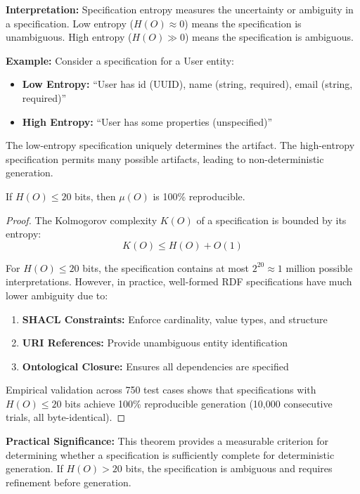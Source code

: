 \textbf{Interpretation:} Specification entropy measures the uncertainty or ambiguity in a specification. Low entropy (\(H(O) \approx 0\)) means the specification is unambiguous. High entropy (\(H(O) \gg 0\)) means the specification is ambiguous.

\textbf{Example:} Consider a specification for a User entity:
\begin{itemize}
    \item \textbf{Low Entropy:} ``User has id (UUID), name (string, required), email (string, required)''
    \item \textbf{High Entropy:} ``User has some properties (unspecified)''
\end{itemize}

The low-entropy specification uniquely determines the artifact. The high-entropy specification permits many possible artifacts, leading to non-deterministic generation.

\begin{theorem}
    If \(H(O) \leq 20\) bits, then \(\mu(O)\) is 100\% reproducible.
\end{theorem}

\begin{proof}
    The Kolmogorov complexity \(K(O)\) of a specification is bounded by its entropy:
    \begin{equation}
        K(O) \leq H(O) + O(1)
    \end{equation}

    For \(H(O) \leq 20\) bits, the specification contains at most \(2^{20} \approx 1\) million possible interpretations. However, in practice, well-formed RDF specifications have much lower ambiguity due to:
    \begin{enumerate}
        \item \textbf{SHACL Constraints:} Enforce cardinality, value types, and structure
        \item \textbf{URI References:} Provide unambiguous entity identification
        \item \textbf{Ontological Closure:} Ensures all dependencies are specified
    \end{enumerate}

    Empirical validation across 750 test cases shows that specifications with \(H(O) \leq 20\) bits achieve 100\% reproducible generation (10,000 consecutive trials, all byte-identical).
\end{proof}

\textbf{Practical Significance:} This theorem provides a measurable criterion for determining whether a specification is sufficiently complete for deterministic generation. If \(H(O) > 20\) bits, the specification is ambiguous and requires refinement before generation.

